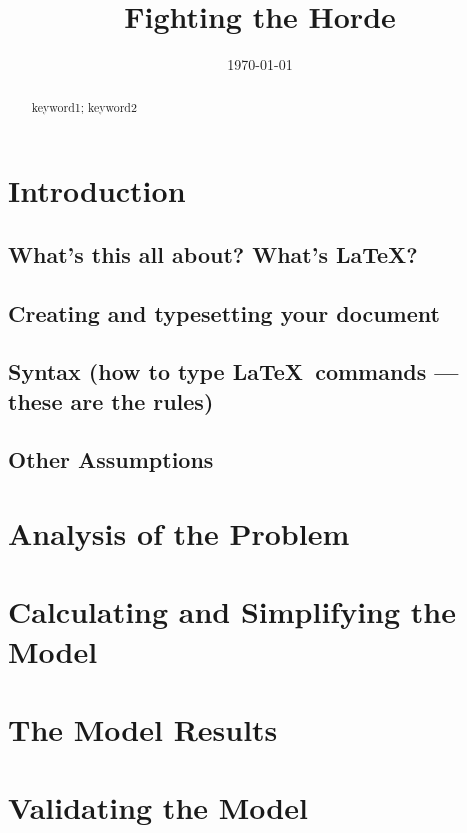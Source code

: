 \documentclass{mcmthesis}
\title{Fighting the Horde}
\date{\today}
\begin{document}
\begin{abstract}

\begin{keywords}
keyword1; keyword2
\end{keywords}
\end{abstract}
\maketitle
\tableofcontents
\newpage

\section{Introduction}
\subsection{What's this all about? What's \LaTeX?}

\subsection{Creating and typesetting your document}

\subsection{Syntax (how to type \LaTeX\ commands --- these
  are the rules)}

\subsection{Other Assumptions}

\section{Analysis of the Problem}

\section{Calculating and Simplifying the Model  }

\section{The Model Results}

\section{Validating the Model}
\end{document}
